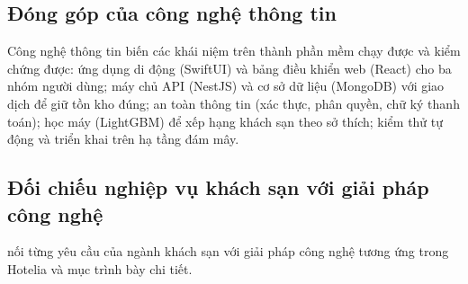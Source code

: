 \subsection{Đóng góp của công nghệ thông tin}

Công nghệ thông tin biến các khái niệm trên thành phần mềm chạy được và kiểm chứng được: ứng dụng di động (SwiftUI) và bảng điều khiển web (React) cho ba nhóm người dùng; máy chủ API (NestJS) và cơ sở dữ liệu (MongoDB) với giao dịch để giữ tồn kho đúng; an toàn thông tin (xác thực, phân quyền, chữ ký thanh toán); học máy (LightGBM) để xếp hạng khách sạn theo sở thích; kiểm thử tự động và triển khai trên hạ tầng đám mây.

\subsection{Đối chiếu nghiệp vụ khách sạn với giải pháp công nghệ}

 nối từng yêu cầu của ngành khách sạn với giải pháp công nghệ tương ứng trong Hotelia và mục trình bày chi tiết.

